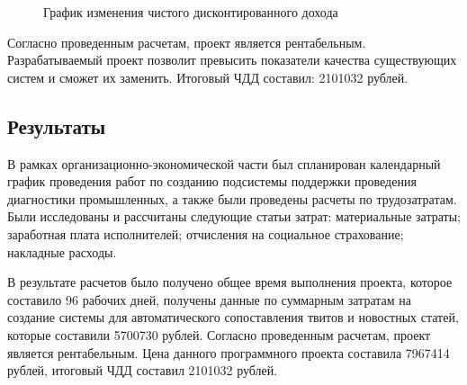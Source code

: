         \begin{figure}[h!]
            \centering
            \caption{График изменения чистого дисконтированного дохода}
            \label{pic:pdd}
        \end{figure}

        Согласно проведенным расчетам, проект является рентабельным.
        Разрабатываемый проект позволит превысить показатели качества существующих систем и сможет их заменить.
        Итоговый ЧДД составил: 2101032 рублей.

    \subsection{Результаты}
        В рамках организационно-экономической части был спланирован календарный график проведения работ по созданию подсистемы поддержки проведения диагностики промышленных, а также были проведены расчеты по трудозатратам.
        Были исследованы и рассчитаны следующие статьи затрат: материальные затраты; заработная плата исполнителей; отчисления на социальное страхование; накладные расходы.

        В результате расчетов было получено общее время выполнения проекта, которое составило 96 рабочих дней,
        получены данные по суммарным затратам на создание системы для автоматического сопоставления твитов и новостных статей, которые составили 5700730 рублей.
        Согласно проведенным расчетам, проект является рентабельным.
        Цена данного программного проекта составила 7967414 рублей, итоговый ЧДД составил 2101032 рублей.

